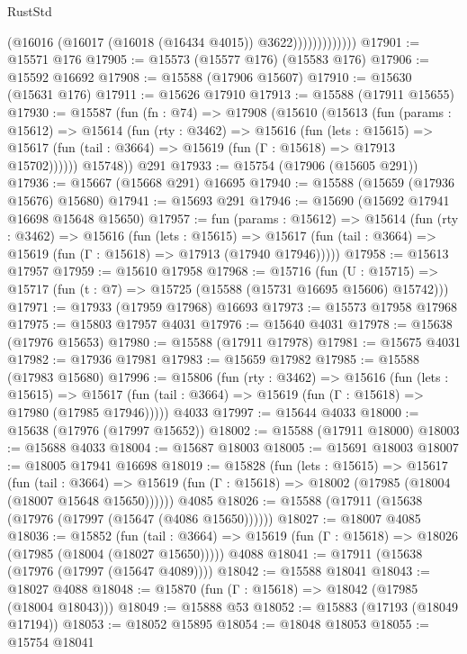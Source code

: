 \begin{lexlean}{RustStd}
\begin{coremodule}
                          (@16016 (@16017 (@16018 (@16434 @4015)) @3622)))))))))))))
@17901 := @15571 @176
@17905 := @15573 (@15577 @176) (@15583 @176)
@17906 := @15592 @16692
@17908 := @15588 (@17906 @15607)
@17910 := @15630 (@15631 @176)
@17911 := @15626 @17910
@17913 := @15588 (@17911 @15655)
@17930 := @15587
    (fun (fn : @74) =>
    @17908
      (@15610
        (@15613
          (fun (params : @15612) =>
          @15614
            (fun (rty : @3462) =>
            @15616
              (fun (lets : @15615) =>
              @15617 (fun (tail : @3664) => @15619 (fun (Γ : @15618) => @17913 @15702))))))
        @15748))
    @291
@17933 := @15754 (@17906 (@15605 @291))
@17936 := @15667 (@15668 @291) @16695
@17940 := @15588 (@15659 (@17936 @15676) @15680)
@17941 := @15693 @291
@17946 := @15690 (@15692 @17941 @16698 @15648 @15650)
@17957 := fun (params : @15612) =>
  @15614
    (fun (rty : @3462) =>
    @15616
      (fun (lets : @15615) =>
      @15617 (fun (tail : @3664) => @15619 (fun (Γ : @15618) => @17913 (@17940 @17946)))))
@17958 := @15613 @17957
@17959 := @15610 @17958
@17968 := @15716
    (fun (U : @15715) => @15717 (fun (t : @7) => @15725 (@15588 (@15731 @16695 @15606) @15742)))
@17971 := @17933 (@17959 @17968) @16693
@17973 := @15573 @17958 @17968
@17975 := @15803 @17957 @4031
@17976 := @15640 @4031
@17978 := @15638 (@17976 @15653)
@17980 := @15588 (@17911 @17978)
@17981 := @15675 @4031
@17982 := @17936 @17981
@17983 := @15659 @17982
@17985 := @15588 (@17983 @15680)
@17996 := @15806
    (fun (rty : @3462) =>
    @15616
      (fun (lets : @15615) =>
      @15617 (fun (tail : @3664) => @15619 (fun (Γ : @15618) => @17980 (@17985 @17946)))))
    @4033
@17997 := @15644 @4033
@18000 := @15638 (@17976 (@17997 @15652))
@18002 := @15588 (@17911 @18000)
@18003 := @15688 @4033
@18004 := @15687 @18003
@18005 := @15691 @18003
@18007 := @18005 @17941 @16698
@18019 := @15828
    (fun (lets : @15615) =>
    @15617
      (fun (tail : @3664) =>
      @15619 (fun (Γ : @15618) => @18002 (@17985 (@18004 (@18007 @15648 @15650))))))
    @4085
@18026 := @15588 (@17911 (@15638 (@17976 (@17997 (@15647 (@4086 @15650))))))
@18027 := @18007 @4085
@18036 := @15852
    (fun (tail : @3664) => @15619 (fun (Γ : @15618) => @18026 (@17985 (@18004 (@18027 @15650)))))
    @4088
@18041 := @17911 (@15638 (@17976 (@17997 (@15647 @4089))))
@18042 := @15588 @18041
@18043 := @18027 @4088
@18048 := @15870 (fun (Γ : @15618) => @18042 (@17985 (@18004 @18043)))
@18049 := @15888 @53
@18052 := @15883 (@17193 (@18049 @17194))
@18053 := @18052 @15895
@18054 := @18048 @18053
@18055 := @15754 @18041

\end{coremodule}
\end{lexlean}
